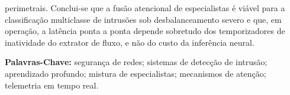 \documentclass[
	12pt,		%
	a4paper,	%
	openright,  %
	oneside,	%
	chapter=TITLE,		%
	section=TITLE,		%
	english,	%
	brazilian   %
]{abntex2}
\begin{document}
\begin{resumo}
perimetrais. Conclui-se que a fusão atencional de especialistas é viável para a classificação multiclasse de intrusões sob desbalanceamento severo e que, em operação, a latência ponta a ponta depende sobretudo dos temporizadores de inatividade do extrator de fluxo, e não do custo da inferência neural.

	\vspace*{0.5cm}
	\noindent\textbf{{Palavras-Chave: }} segurança de redes; sistemas de detecção de intrusão; aprendizado profundo; mistura de especialistas; mecanismos de atenção; telemetria em tempo real.
\end{resumo}

%
\end{document}
